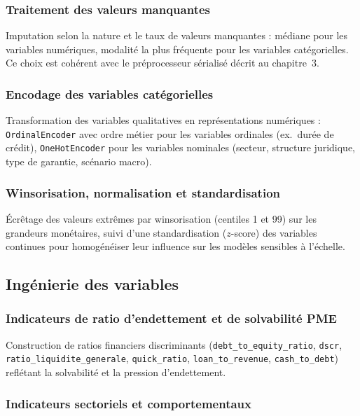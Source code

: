 \documentclass[a4paper,12pt,oneside]{report}
\begin{document}
\subsubsection{Traitement des valeurs manquantes}

Imputation selon la nature et le taux de valeurs manquantes : médiane pour les variables
numériques, modalité la plus fréquente pour les variables catégorielles. Ce choix est cohérent
avec le préprocesseur sérialisé décrit au chapitre~3.

\subsubsection{Encodage des variables catégorielles}

Transformation des variables qualitatives en représentations numériques : \texttt{OrdinalEncoder}
avec ordre métier pour les variables ordinales (ex.\ durée de crédit), \texttt{OneHotEncoder}
pour les variables nominales (secteur, structure juridique, type de garantie, scénario macro).

\subsubsection{Winsorisation, normalisation et standardisation}

Écrêtage des valeurs extrêmes par winsorisation (centiles 1 et 99) sur les grandeurs
monétaires, suivi d'une standardisation ($z$-score) des variables continues pour
homogénéiser leur influence sur les modèles sensibles à l'échelle.

\subsection{Ingénierie des variables}

\subsubsection{Indicateurs de ratio d'endettement et de solvabilité PME}

Construction de ratios financiers discriminants (\texttt{debt\_to\_equity\_ratio}, \texttt{dscr},
\texttt{ratio\_liquidite\_generale}, \texttt{quick\_ratio}, \texttt{loan\_to\_revenue},
\texttt{cash\_to\_debt}) reflétant la solvabilité et la pression d'endettement.

\subsubsection{Indicateurs sectoriels et comportementaux}
\end{document}
